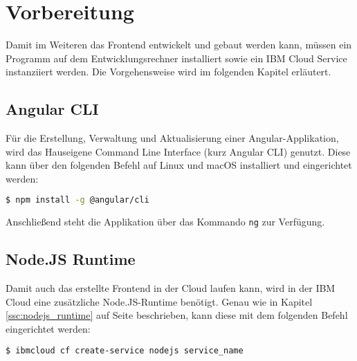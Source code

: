 \section{Vorbereitung}
Damit im Weiteren das Frontend entwickelt und gebaut werden kann, müssen ein Programm auf dem Entwicklungsrechner
installiert sowie ein IBM Cloud Service instanziiert werden. Die Vorgehensweise wird im folgenden Kapitel erläutert.

\subsection{Angular CLI}
Für die Erstellung, Verwaltung und Aktualisierung einer Angular-Applikation, wird das Hauseigene Command Line Interface
(kurz Angular CLI) genutzt. Diese kann über den folgenden Befehl auf Linux und macOS installiert und eingerichtet werden:

\begin{lstlisting}[language=bash, caption=Installation Angular CLI, label=Installation Angular CLI]
$ npm install -g @angular/cli
\end{lstlisting}

Anschließend steht die Applikation über das Kommando \texttt{ng} zur Verfügung.

\subsection{Node.JS Runtime}
Damit auch das erstellte Frontend in der Cloud laufen kann, wird in der IBM Cloud eine zusätzliche Node.JS-Runtime
benötigt. Genau wie in Kapitel \ref{ssc:nodejs_runtime} auf Seite \pageref{ssc:nodejs_runtime} beschrieben, kann diese
mit dem folgenden Befehl eingerichtet werden:

\begin{lstlisting}[language=bash, caption=Instanziierung der Node.JS Runtime, label=Instanziierung der Node.JS Runtime]
$ ibmcloud cf create-service nodejs service_name
\end{lstlisting}